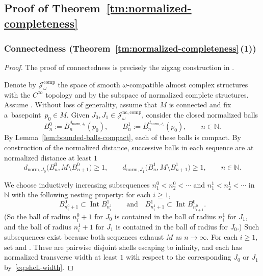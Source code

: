 \documentclass[10pt,a4paper]{amsart}
\numberwithin{equation}{section}
\newcommand{\bN}{{\mathbb N}}
\theoremstyle{definition}
\begin{document}
\subsection{Proof of Theorem~\ref{tm:normalized-completeness}}

\subsubsection[Connectedness (Theorem~1.6 (1))]{Connectedness (Theorem~\ref{tm:normalized-completeness}\,(1))}
\begin{proof}%
The proof of connectedness is precisely the zigzag construction in \cite[Theorem~4.7]{GromanFloerOpen}.

Denote by $\mathcal{J}^{\mathrm{comp}}_\omega$ the space of smooth $\omega$-compatible almost complex structures with the $C^\infty$ topology and by  the subspace of normalized complete structures.
Assume .
Without loss of generality, assume that $M$ is connected and fix a~basepoint~${p_0\in M}$.
Given $J_0,J_1\in\mathcal{J}^{\mathrm{nc,comp}}_\omega$, consider the closed normalized balls
\[
B_n^0:=\overline B^{d_{\mathrm{norm},J_0}}_{n}(p_0),\qquad B_n^1:=\overline B^{d_{\mathrm{norm},J_1}}_{n}(p_0),\qquad n\in\bN.
\]
By Lemma~\ref{lem:bounded-balls-compact}, each of these balls is compact.
By construction of the normalized distance, successive balls in each sequence are at normalized distance at least $1$
\begin{equation}\label{eq:shell-width}
d_{\mathrm{norm},J_0}\bigl( B_n^0, M\setminus B_{n+1}^0\bigr)\ge 1,\qquad d_{\mathrm{norm},J_1}\bigl( B_n^1, M\setminus B_{n+1}^1\bigr)\ge 1,\qquad n\in\bN.
\end{equation}

We choose inductively increasing subsequences $n_1^0<n_2^0<\cdots$ and $n_1^1<n_2^1<\cdots$ in $\bN$ with the following nesting property: for each $i\ge 1$,
\[
B_{n_i^0+1}^0 \subset \operatorname{Int} B_{n_i^1}^1
\qquad \text{and} \quad B_{n_i^1+1}^1 \subset \operatorname{Int}B_{n_{i+1}^0}^0.
\]
(So the ball of radius $n_i^0+1$ for $J_0$ is contained in the ball of radius $n_i^1$ for $J_1$, and the ball of radius $n_i^1+1$ for $J_1$ is contained in the ball of radius  for $J_0$.)
Such subsequences exist because both sequences exhaust $M$ as $n\to\infty$.
For each $i\ge 1$, set  and .
These are pairwise disjoint shells escaping to infinity, and each has normalized transverse width at least $1$ with respect to the corresponding $J_0$ or $J_1$ by~\eqref{eq:shell-width}.


\end{proof}
\end{document}
